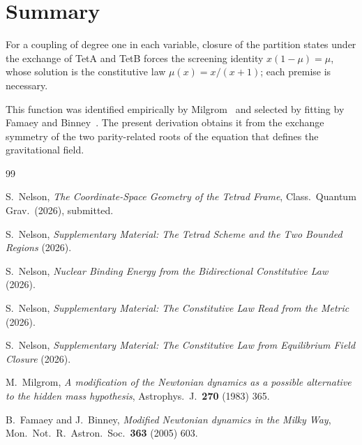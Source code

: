 \documentclass[twocolumn]{iopjournal}
\begin{document}

\section*{Summary}

For a coupling of degree one in each variable, closure of the
partition states under the exchange of TetA and TetB forces the
screening identity $x(1-\mu) = \mu$, whose solution is the
constitutive law $\mu(x) = x/(x+1)$; each premise is necessary.

This function was identified empirically by
Milgrom~\cite{Milgrom1983} and selected by fitting by
Famaey and Binney~\cite{FamaeyBinney2005}. The present
derivation obtains it from the exchange symmetry of the
two parity-related roots of the equation that defines the
gravitational field.


{\small
\begin{thebibliography}{99}

S.~Nelson,
\textit{The Coordinate-Space Geometry of the Tetrad Frame},
Class.\ Quantum Grav.\ (2026), submitted.

S.~Nelson,
\textit{Supplementary Material: The Tetrad Scheme and the Two
Bounded Regions} (2026).

S.~Nelson,
\textit{Nuclear Binding Energy from the Bidirectional
Constitutive Law} (2026).

S.~Nelson,
\textit{Supplementary Material: The Constitutive Law Read from
the Metric} (2026).

S.~Nelson,
\textit{Supplementary Material: The Constitutive Law from
Equilibrium Field Closure} (2026).

M.~Milgrom,
\textit{A modification of the Newtonian dynamics as a possible
alternative to the hidden mass hypothesis},
Astrophys.\ J.\ \textbf{270} (1983) 365.

B.~Famaey and J.~Binney,
\textit{Modified Newtonian dynamics in the Milky Way},
Mon.\ Not.\ R.\ Astron.\ Soc.\ \textbf{363} (2005) 603.

\end{thebibliography}
}
\end{document}
